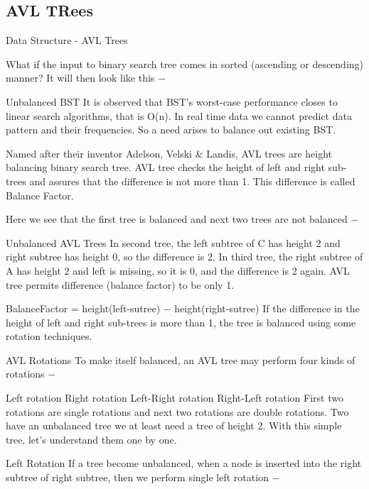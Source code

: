 \begin{frame}
\begin{frame}
\section{AVL TRees}

Data Structure - AVL Trees

\begin{frame}
What if the input to binary search tree comes in sorted (ascending or descending) manner? It will then look like this −

Unbalanced BST
It is observed that BST's worst-case performance closes to linear search algorithms, that is Ο(n). In real time data we cannot predict data pattern and their frequencies. So a need arises to balance out existing BST.

Named after their inventor Adelson, Velski & Landis, AVL trees are height balancing binary search tree. AVL tree checks the height of left and right sub-trees and assures that the difference is not more than 1. This difference is called Balance Factor.

Here we see that the first tree is balanced and next two trees are not balanced −

\end{frame}
\begin{frame}
Unbalanced AVL Trees
In second tree, the left subtree of C has height 2 and right subtree has height 0, so the difference is 2. In third tree, the right subtree of A has height 2 and left is missing, so it is 0, and the difference is 2 again. AVL tree permits difference (balance factor) to be only 1.

BalanceFactor = height(left-sutree) − height(right-sutree)
If the difference in the height of left and right sub-trees is more than 1, the tree is balanced using some rotation techniques.

AVL Rotations
To make itself balanced, an AVL tree may perform four kinds of rotations −

Left rotation
Right rotation
Left-Right rotation
Right-Left rotation
First two rotations are single rotations and next two rotations are double rotations. Two have an unbalanced tree we at least need a tree of height 2. With this simple tree, let's understand them one by one.

Left Rotation
If a tree become unbalanced, when a node is inserted into the right subtree of right subtree, then we perform single left rotation −


\end{frame}
\end{frame}
\end{frame}
